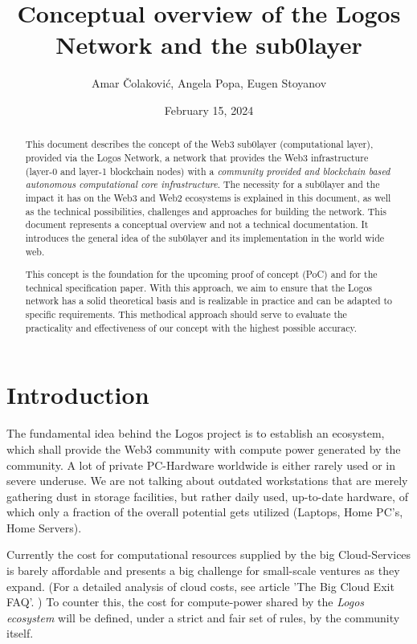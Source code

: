\documentclass[]{article}
\title{Conceptual overview of the Logos Network and the sub0layer}
\author{Amar Čolaković, Angela Popa, Eugen Stoyanov}
\affil{LogosLabs}
\date{February 15, 2024}
\begin{document}
\maketitle

\begin{abstract}
This document describes the concept of the {Web3 sub0layer} (computational layer), provided via the Logos Network, a network that provides the Web3 infrastructure (layer-0 and layer-1 blockchain nodes) with a \textit{community provided and blockchain based autonomous computational core infrastructure}.
The necessity for a sub0layer and the impact it has on the Web3 and Web2 ecosystems is explained in this document, as well as the technical possibilities, challenges and approaches for building the network.   
This document represents a conceptual overview and not a technical documentation. It introduces the general idea of the sub0layer and its implementation in the world wide web.

This concept is the foundation for the upcoming proof of concept (PoC) and for the technical specification paper. 
With this approach, we aim to ensure that the Logos network has a solid theoretical basis and is realizable in practice and can be adapted to specific requirements.
This methodical approach should serve to evaluate the practicality and effectiveness of our concept with the highest possible accuracy.    
\end{abstract}

\tableofcontents
\newpage

\section{Introduction}
The fundamental idea behind the Logos project is to establish an ecosystem, which shall provide the Web3 community with compute power generated by the community.
A lot of private PC-Hardware worldwide is either rarely used or in severe underuse. 
We are not talking about outdated workstations that are merely gathering dust in storage facilities, but rather daily used, up-to-date hardware, of which only a fraction of the overall potential gets utilized (Laptops, Home PC’s, Home Servers).

Currently the cost for computational resources supplied by the big Cloud-Services is barely affordable and presents a big challenge for small-scale ventures as they expand. (For a detailed analysis of cloud costs, see article 'The Big Cloud Exit FAQ'. \cite{david-hainemeier-hansson})
To counter this, the cost for compute-power shared by the \textit{Logos ecosystem} will be defined, under a strict and fair set of rules, by the community itself.
\end{document}
